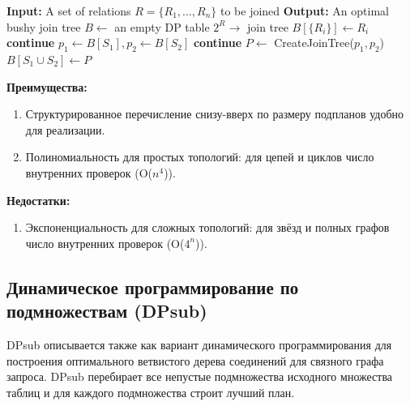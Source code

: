 \begin{algorithm}[H]
    \caption{DPsize$(\{R_1,\dots,R_n\},\,\textit{C}(T_1,T_2))$}
    \begin{algorithmic}[1]
        \State \textbf{Input:} A set of relations $R = \{R_1, \dots, R_n\}$ to be joined
        \State \textbf{Output:} An optimal bushy join tree
        \State $B \gets$ an empty DP table $2^R \to$ join tree
            \State $B[\{R_i\}] \gets R_i$
        \EndFor
                    \State \textbf{continue}
                \EndIf
                \State $p_1 \gets B[S_1], p_2 \gets B[S_2]$
                 \textbf{continue} \EndIf
                \State $P \gets$ CreateJoinTree($p_1, p_2$)
                    \State $B[S_1 \cup S_2] \gets P$
                \EndIf
            \EndFor
        \EndFor
    \end{algorithmic}
\end{algorithm}

\textbf{Преимущества:}
\begin{enumerate}
    \item Структурированное перечисление снизу-вверх по размеру подпланов удобно для реализации.
    \item Полиномиальность для простых топологий: для цепей и циклов число внутренних проверок (O($n^{4}$)).
\end{enumerate}

\textbf{Недостатки:}
\begin{enumerate}
    \item Экспоненциальность для сложных топологий: для звёзд и полных графов число внутренних проверок (O($4^{n}$)).
\end{enumerate}

\subsection{Динамическое программирование по подмножествам (DPsub)}


DPsub\cite{SizeSub} описывается также как вариант динамического программирования для построения оптимального ветвистого 
дерева соединений для связного графа запроса. DPsub перебирает все непустые
подмножества исходного множества таблиц и для каждого подмножества строит лучший план.


